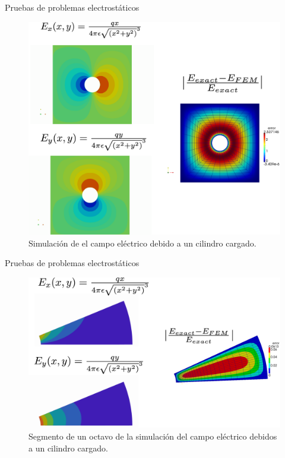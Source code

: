 \documentclass[xcolor=table,serif]{beamer}
\begin{document}
	\begin{frame}{Pruebas de problemas electrostáticos}
		\begin{figure}
		\centering
		\includegraphics[scale=0.15]{charged_cylinder_inside_rectangle.eps}
		\caption{Simulación de el campo eléctrico debido a un cilindro cargado.}
		\end{figure}
	\end{frame}
	\begin{frame}{Pruebas de problemas electrostáticos}
		\begin{figure}
		\centering
		\includegraphics[scale=0.15]{Eight_of_cylinder.eps}
		\caption{Segmento de un octavo de la simulación del campo eléctrico debidos a un cilindro cargado.}
		\end{figure}
	\end{frame}
\end{document}
